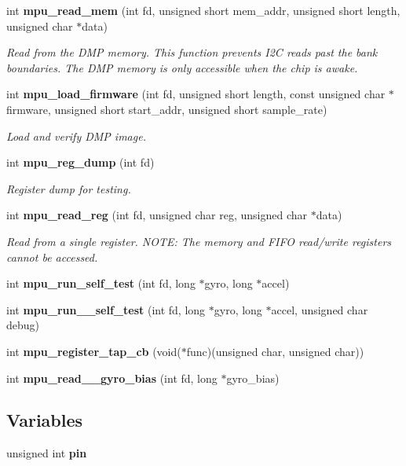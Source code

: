 \begin{DoxyCompactItemize}
int \textbf{ mpu\+\_\+read\+\_\+mem} (int fd, unsigned short mem\+\_\+addr, unsigned short length, unsigned char $\ast$data)
\begin{DoxyCompactList}\small\item\em Read from the D\+MP memory. This function prevents I2C reads past the bank boundaries. The D\+MP memory is only accessible when the chip is awake. \end{DoxyCompactList}\item 
int \textbf{ mpu\+\_\+load\+\_\+firmware} (int fd, unsigned short length, const unsigned char $\ast$firmware, unsigned short start\+\_\+addr, unsigned short sample\+\_\+rate)
\begin{DoxyCompactList}\small\item\em Load and verify D\+MP image. \end{DoxyCompactList}\item 
int \textbf{ mpu\+\_\+reg\+\_\+dump} (int fd)
\begin{DoxyCompactList}\small\item\em Register dump for testing. \end{DoxyCompactList}\item 
int \textbf{ mpu\+\_\+read\+\_\+reg} (int fd, unsigned char reg, unsigned char $\ast$data)
\begin{DoxyCompactList}\small\item\em Read from a single register. N\+O\+TE\+: The memory and F\+I\+FO read/write registers cannot be accessed. \end{DoxyCompactList}\item 
int \textbf{ mpu\+\_\+run\+\_\+self\+\_\+test} (int fd, long $\ast$gyro, long $\ast$accel)
\item 
int \textbf{ mpu\+\_\+run\+\_\+\_\+self\+\_\+test} (int fd, long $\ast$gyro, long $\ast$accel, unsigned char debug)
\item 
int \textbf{ mpu\+\_\+register\+\_\+tap\+\_\+cb} (void($\ast$func)(unsigned char, unsigned char))
\item 
int \textbf{ mpu\+\_\+read\+\_\+\_\+gyro\+\_\+bias} (int fd, long $\ast$gyro\+\_\+bias)
\end{DoxyCompactItemize}
\subsection*{Variables}
\begin{DoxyCompactItemize}
\item 
unsigned int \textbf{ pin}
\end{DoxyCompactItemize}



